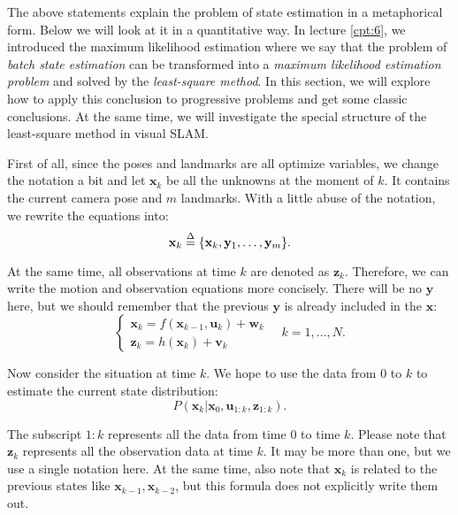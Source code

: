 The above statements explain the problem of state estimation in a metaphorical form. Below we will look at it in a quantitative way. In lecture \ref{cpt:6}, we introduced the maximum likelihood estimation where we say that the problem of \textit{batch state estimation} can be transformed into a \textit{maximum likelihood estimation problem} and solved by the \textit{least-square method}. In this section, we will explore how to apply this conclusion to progressive problems and get some classic conclusions. At the same time, we will investigate the special structure of the least-square method in visual SLAM.

First of all, since the poses and landmarks are all optimize variables, we change the notation a bit and let $\mathbf{x}_k$ be all the unknowns at the moment of $k$. It contains the current camera pose and $m$ landmarks. With a little abuse of the notation, we rewrite the equations into:
\begin{equation}
	\mathbf{x}_k  \buildrel \Delta \over =  \{ \mathbf{x}_k, \mathbf{y}_1, \ldots, \mathbf{y}_m \}.
\end{equation}

At the same time, all observations at time $k$ are denoted as $\mathbf{z}_k$. Therefore, we can write the motion and observation equations more concisely. There will be no $\mathbf{y}$ here, but we should remember that the previous $\mathbf{y}$ is already included in the $\mathbf{x}$:
\begin{equation}
	\left\{ \begin{array}{l}
		{\mathbf{x}_k} = f\left( {{\mathbf{x}_{k - 1}},{\mathbf{u}_k}} \right) + \mathbf{w}_k \\
		{\mathbf{z}_{k}} = h\left( \mathbf{x}_k  \right)+ \mathbf{v}_{k}
	\end{array} \right. \quad k=1, \ldots, N .
\end{equation}

Now consider the situation at time $k$. We hope to use the data from $0$ to $k$ to estimate the current state distribution:
\begin{equation}
	P(\mathbf{x}_k | \mathbf{x}_0, \mathbf{u}_{1:k}, \mathbf{z}_{1:k}).
\end{equation}

The subscript $1:k$ represents all the data from time $0$ to time $k$. Please note that $\mathbf{z}_k$ represents all the observation data at time $k$. It may be more than one, but we use a single notation here. At the same time, also note that $\mathbf{x}_k$ is related to the previous states like $\mathbf{x}_{k-1}, \mathbf{x}_{k-2}$, but this formula does not explicitly write them out.

